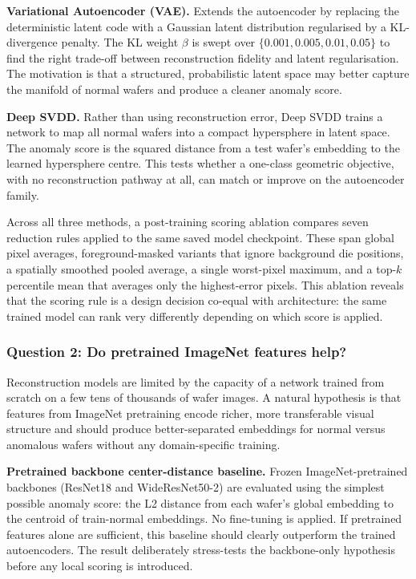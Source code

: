 \documentclass[11pt]{article}
\begin{document}
\textbf{Variational Autoencoder (VAE).} Extends the autoencoder by replacing
the deterministic latent code with a Gaussian latent distribution regularised
by a KL-divergence penalty. The KL weight $\beta$ is swept over
$\{0.001, 0.005, 0.01, 0.05\}$ to find the right trade-off between
reconstruction fidelity and latent regularisation. The motivation is that a
structured, probabilistic latent space may better capture the manifold of
normal wafers and produce a cleaner anomaly score.

\textbf{Deep SVDD.} Rather than using reconstruction error, Deep SVDD
trains a network to map all normal wafers into a compact hypersphere in
latent space. The anomaly score is the squared distance from a test
wafer's embedding to the learned hypersphere centre. This tests whether
a one-class geometric objective, with no reconstruction pathway at all,
can match or improve on the autoencoder family.

Across all three methods, a post-training scoring ablation compares seven
reduction rules applied to the same saved model checkpoint. These span global
pixel averages, foreground-masked variants that ignore background die positions,
a spatially smoothed pooled average, a single worst-pixel maximum, and a
top-$k$ percentile mean that averages only the highest-error pixels. This
ablation reveals that the scoring rule is a design decision co-equal with
architecture: the same trained model can rank very differently depending on
which score is applied.

\subsubsection{Question 2: Do pretrained ImageNet features help?}

Reconstruction models are limited by the capacity of a network trained
from scratch on a few tens of thousands of wafer images. A natural hypothesis
is that features from ImageNet pretraining encode richer, more transferable
visual structure and should produce better-separated embeddings for normal
versus anomalous wafers without any domain-specific training.

\textbf{Pretrained backbone center-distance baseline.} Frozen
ImageNet-pretrained backbones (ResNet18 and WideResNet50-2) are evaluated
using the simplest possible anomaly score: the L2 distance from each wafer's
global embedding to the centroid of train-normal embeddings. No fine-tuning
is applied. If pretrained features alone are sufficient, this baseline should
clearly outperform the trained autoencoders. The result deliberately stress-tests
the backbone-only hypothesis before any local scoring is introduced.
\end{document}

